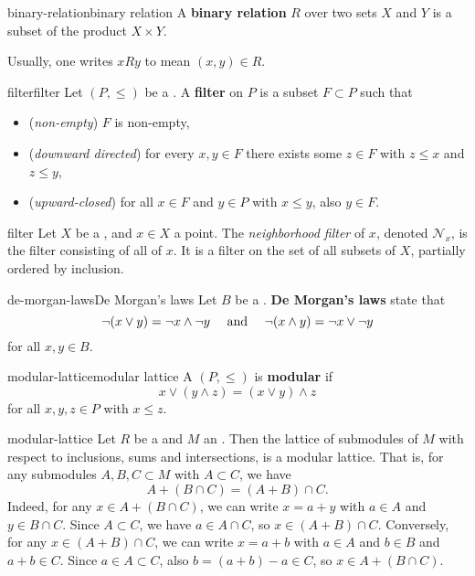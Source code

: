 \begin{topic}{binary-relation}{binary relation}
    A \textbf{binary relation} $R$ over two sets $X$ and $Y$ is a subset of the product $X \times Y$.
    
    Usually, one writes $x R y$ to mean $(x, y) \in R$.
\end{topic}

\begin{topic}{filter}{filter}
    Let $(P, \le)$ be a . A \textbf{filter} on $P$ is a subset $F \subset P$ such that
    \begin{itemize}
        \item (\textit{non-empty}) $F$ is non-empty,
        \item (\textit{downward directed}) for every $x, y \in F$ there exists some $z \in F$ with $z \le x$ and $z \le y$,
        \item (\textit{upward-closed}) for all $x \in F$ and $y \in P$ with $x \le y$, also $y \in F$.
    \end{itemize}
\end{topic}

\begin{example}{filter}
    Let $X$ be a , and $x \in X$ a point. The \textit{neighborhood filter} of $x$, denoted $\mathcal{N}_x$, is the filter consisting of all  of $x$. It is a filter on the set of all subsets of $X$, partially ordered by inclusion.
\end{example}

\begin{topic}{de-morgan-laws}{De Morgan's laws}
    Let $B$ be a . \textbf{De Morgan's laws} state that
    \[ \neg (x \lor y) = \neg x \land \neg y \quad \textup{ and } \quad \neg (x \land y) = \neg x \lor \neg y \]
    for all $x, y \in B$.
\end{topic}

\begin{topic}{modular-lattice}{modular lattice}
    A  $(P, \le)$ is \textbf{modular} if
    \[ x \lor (y \land z) = (x \lor y) \land z \]
    for all $x, y, z \in P$ with $x \le z$.
\end{topic}

\begin{example}{modular-lattice}
    Let $R$ be a  and $M$ an . Then the lattice of submodules of $M$ with respect to inclusions, sums and intersections, is a modular lattice. That is, for any submodules $A, B, C \subset M$ with $A \subset C$, we have
    \[ A + (B \cap C) = (A + B) \cap C . \]
    Indeed, for any $x \in A + (B \cap C)$, we can write $x = a + y$ with $a \in A$ and $y \in B \cap C$. Since $A \subset C$, we have $a \in A \cap C$, so $x \in (A + B) \cap C$. Conversely, for any $x \in (A + B) \cap C$, we can write $x = a + b$ with $a \in A$ and $b \in B$ and $a + b \in C$. Since $a \in A \subset C$, also $b = (a + b) - a \in C$, so $x \in A + (B \cap C)$.
\end{example}

